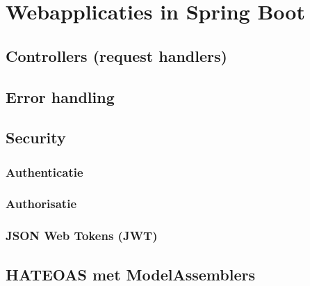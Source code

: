 \section{Webapplicaties in Spring Boot}
\subsection{Controllers (request handlers)}
\subsection{Error handling}

\subsection{Security}
\subsubsection{Authenticatie}
\subsubsection{Authorisatie}
\subsubsection{JSON Web Tokens (JWT)}

\subsection{HATEOAS met ModelAssemblers}

